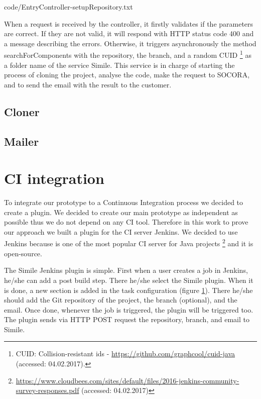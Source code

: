 
{code/EntryController-setupRepository.txt}

When a request is received by the controller, it firstly validates if the parameters are correct. If they are not valid, it will respond with HTTP status code 400 and a message describing the errors. Otherwise, it triggers asynchronously the method searchForComponents with the repository, the branch, and a random CUID \footnote{CUID: Collision-resistant ids - \url{https://github.com/graphcool/cuid-java} (accessed: 04.02.2017).} as a folder name of the service Simile. This service is in charge of starting the process of cloning the project, analyse the code, make the request to SOCORA, and to send the email with the result to the customer.
\subsection{Cloner}
\subsection{Mailer}

\section{CI integration}
To integrate our prototype to a Continuous Integration process we decided to create a plugin. We decided to create our main prototype as independent as possible thus we do not depend on any CI tool. Therefore in this work to prove our approach we built a plugin for the CI server Jenkins. We decided to use Jenkins because is one of the most popular CI server for Java projects \footnote{\url{https://www.cloudbees.com/sites/default/files/2016-jenkins-community-survey-responses.pdf} (accessed: 04.02.2017)} and it is open-source.

The Simile Jenkins plugin is simple. First when a user creates a job in Jenkins, he/she can add a post build step. There he/she select the Simile plugin. When it is done, a new section is added in the task configuration (figure \ref{}). There he/she should add the Git repository of the project, the branch (optional), and the email. Once done, whenever the job is triggered, the plugin will be triggered too. The plugin sends via HTTP POST request the repository, branch, and email to Simile.

